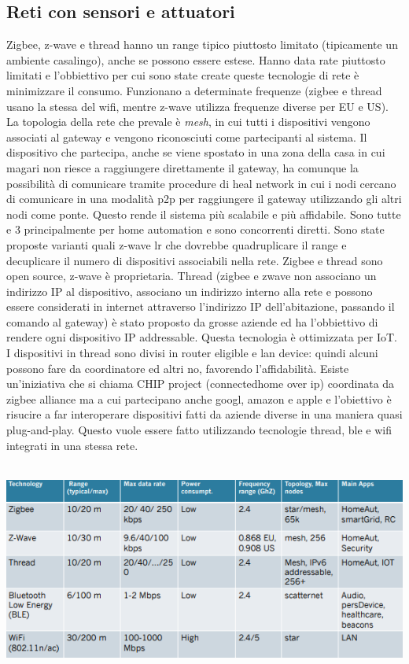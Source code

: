 \subsection{Reti con sensori e attuatori}
Zigbee, z-wave e thread hanno un range tipico piuttosto limitato (tipicamente un ambiente casalingo), anche se possono essere estese. Hanno data rate piuttosto limitati e l'obbiettivo per cui sono state create queste tecnologie di rete è minimizzare il consumo. Funzionano a determinate frequenze (zigbee e thread usano la stessa del wifi, mentre z-wave utilizza frequenze diverse per EU e US). La topologia della rete che prevale è \textit{mesh}, in cui tutti i dispositivi vengono associati al gateway e vengono riconosciuti come partecipanti al sistema. Il dispositivo che partecipa, anche se viene spostato in una zona della casa in cui magari non riesce a raggiungere direttamente il gateway, ha comunque la possibilità di comunicare tramite procedure di heal network in cui i nodi cercano di comunicare in una modalità p2p per raggiungere il gateway utilizzando gli altri nodi come ponte. Questo rende il sistema più scalabile e più affidabile.  Sono tutte e 3 principalmente per home automation e sono concorrenti diretti. Sono state proposte varianti quali z-wave lr che dovrebbe quadruplicare il range e decuplicare il numero di dispositivi associabili nella rete. Zigbee e thread sono open source, z-wave è proprietaria. Thread (zigbee e zwave non associano un indirizzo IP al dispositivo, associano un indirizzo interno alla rete e possono essere considerati in internet attraverso l'indirizzo IP dell'abitazione, passando il comando al gateway) è stato proposto da grosse aziende ed ha l'obbiettivo di rendere ogni dispositivo IP addressable. Questa tecnologia è ottimizzata per IoT. I dispositivi in thread sono divisi in router eligible e lan device: quindi alcuni possono fare da coordinatore ed altri no, favorendo l'affidabilità.
Esiste un'iniziativa che si chiama CHIP project (connectedhome over ip)  coordinata da zigbee alliance ma a cui partecipano anche googl, amazon e apple e l'obiettivo è risucire a far interoperare dispositivi fatti da aziende diverse in una maniera quasi plug-and-play. Questo vuole essere fatto utilizzando tecnologie thread, ble e wifi integrati in una stessa rete.
\\
\\
\begin{center}
    \includegraphics[width = 1\textwidth]{images/lezione9/network_sensor.png}
\end{center}
\phantom \\


